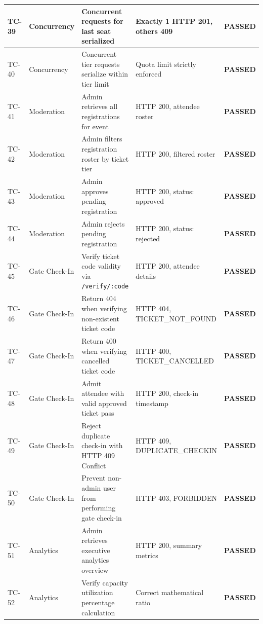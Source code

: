 \documentclass[11pt,a4paper]{report}
\begin{document}
\begin{table}[H]
\begin{tabularx}{\textwidth}{|p{}|p{}|p{}|p{}|X|}
TC-39 & Concurrency & Concurrent requests for last seat serialized & Exactly 1 HTTP 201, others 409 & \color{SuccessGreen}\textbf{PASSED} \\\hline
TC-40 & Concurrency & Concurrent tier requests serialize within tier limit & Quota limit strictly enforced & \color{SuccessGreen}\textbf{PASSED} \\\hline
TC-41 & Moderation & Admin retrieves all registrations for event & HTTP 200, attendee roster & \color{SuccessGreen}\textbf{PASSED} \\\hline
TC-42 & Moderation & Admin filters registration roster by ticket tier & HTTP 200, filtered roster & \color{SuccessGreen}\textbf{PASSED} \\\hline
TC-43 & Moderation & Admin approves pending registration & HTTP 200, status: approved & \color{SuccessGreen}\textbf{PASSED} \\\hline
TC-44 & Moderation & Admin rejects pending registration & HTTP 200, status: rejected & \color{SuccessGreen}\textbf{PASSED} \\\hline
TC-45 & Gate Check-In & Verify ticket code validity via \texttt{/verify/:code} & HTTP 200, attendee details & \color{SuccessGreen}\textbf{PASSED} \\\hline
TC-46 & Gate Check-In & Return 404 when verifying non-existent ticket code & HTTP 404, TICKET\_NOT\_FOUND & \color{SuccessGreen}\textbf{PASSED} \\\hline
TC-47 & Gate Check-In & Return 400 when verifying cancelled ticket code & HTTP 400, TICKET\_CANCELLED & \color{SuccessGreen}\textbf{PASSED} \\\hline
TC-48 & Gate Check-In & Admit attendee with valid approved ticket pass & HTTP 200, check-in timestamp & \color{SuccessGreen}\textbf{PASSED} \\\hline
TC-49 & Gate Check-In & Reject duplicate check-in with HTTP 409 Conflict & HTTP 409, DUPLICATE\_CHECKIN & \color{SuccessGreen}\textbf{PASSED} \\\hline
TC-50 & Gate Check-In & Prevent non-admin user from performing gate check-in & HTTP 403, FORBIDDEN & \color{SuccessGreen}\textbf{PASSED} \\\hline
TC-51 & Analytics & Admin retrieves executive analytics overview & HTTP 200, summary metrics & \color{SuccessGreen}\textbf{PASSED} \\\hline
TC-52 & Analytics & Verify capacity utilization percentage calculation & Correct mathematical ratio & \color{SuccessGreen}\textbf{PASSED} \\\hline

\end{tabularx}
\end{table}
\end{document}
